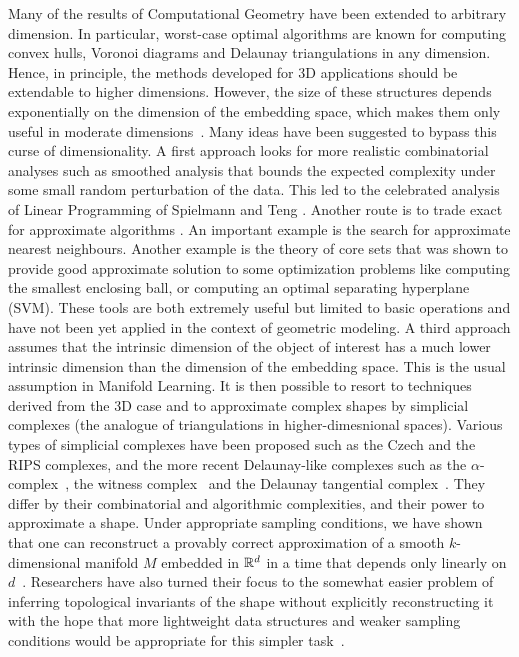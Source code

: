 Many of the results of Computational Geometry have been extended to arbitrary dimension. In particular, worst-case optimal algorithms are known for computing convex hulls, Voronoi diagrams and Delaunay triangulations in any dimension. Hence, in principle, the methods developed for 3D applications should be extendable to higher dimensions. However, the size of these structures depends exponentially on the dimension of the embedding space, which makes them only useful in moderate dimensions~\cite{geometrica-6743i}. Many ideas have been suggested to bypass this curse of dimensionality. A first approach looks for more realistic combinatorial analyses such as smoothed analysis that bounds the expected complexity under some small random perturbation of the data. This led to the celebrated analysis of Linear Programming of Spielmann and Teng \cite{st-saa-2004}. Another route is to trade exact for approximate algorithms \cite{hp-gaa-2011}.  An important example is the search for approximate nearest neighbours. Another example is the theory of core sets that was shown to provide good approximate solution to some optimization problems like computing the smallest enclosing ball, or computing an optimal separating hyperplane (SVM). These tools are both extremely useful but limited to basic operations and have not been yet applied  in the context of geometric modeling. 
A third approach assumes that the intrinsic dimension  of the object of interest has a much lower intrinsic dimension than the dimension of the embedding space. This is the usual assumption in Manifold Learning. It is then possible to resort to techniques derived from the 3D case and to approximate complex shapes by simplicial complexes (the analogue of triangulations in higher-dimesnional spaces).  Various types of simplicial complexes have been proposed such as the Czech and the RIPS complexes,  and the more recent Delaunay-like complexes such as the $\alpha$-complex~\cite{eks-sspp-83,he-ubds-95}, the witness complex~\cite{deSilva2008,cds-tewc-2004} and the Delaunay tangential complex~\cite{geometrica-7142i}. They differ by their combinatorial and algorithmic complexities, and their power to approximate a shape.
Under appropriate sampling conditions, we have shown that one can reconstruct a provably correct approximation of a smooth $k$-dimensional manifold $M$  embedded in $\mathbb R ^d$ in a time that depends only linearly on $d$~\cite{geometrica-7142i}. Researchers have also turned their focus to the somewhat easier problem of inferring topological invariants of the shape without explicitly reconstructing it with the hope that more lightweight data structures and weaker sampling conditions would be appropriate for this simpler task~\cite{nsw-fhm-2008,co-tpr-2008}.


